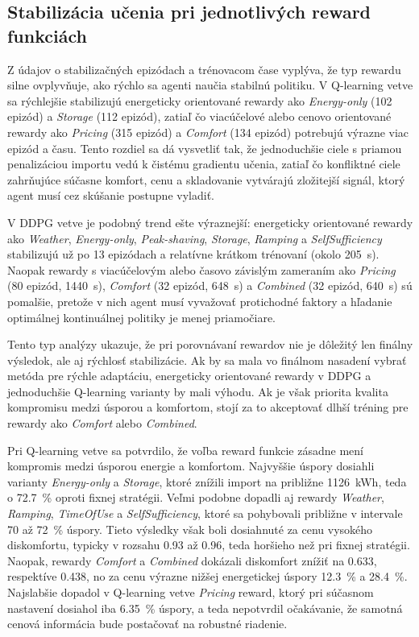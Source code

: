 \documentclass[conference]{IEEEtran}
\begin{document}
\subsection{Stabilizácia učenia pri jednotlivých reward funkciách}

Z údajov o stabilizačných epizódach a trénovacom čase vyplýva, že typ rewardu silne ovplyvňuje, ako rýchlo sa agenti naučia stabilnú politiku. V Q-learning vetve sa rýchlejšie stabilizujú energeticky orientované rewardy ako \textit{Energy-only} (102 epizód) a \textit{Storage} (112 epizód), zatiaľ čo viacúčelové alebo cenovo orientované rewardy ako \textit{Pricing} (315 epizód) a \textit{Comfort} (134 epizód) potrebujú výrazne viac epizód a času. Tento rozdiel sa dá vysvetliť tak, že jednoduchšie ciele s priamou penalizáciou importu vedú k čistému gradientu učenia, zatiaľ čo konfliktné ciele zahrňujúce súčasne komfort, cenu a skladovanie vytvárajú zložitejší signál, ktorý agent musí cez skúšanie postupne vyladiť.

V DDPG vetve je podobný trend ešte výraznejší: energeticky orientované rewardy ako \textit{Weather}, \textit{Energy-only}, \textit{Peak-shaving}, \textit{Storage}, \textit{Ramping} a \textit{SelfSufficiency} stabilizujú už po 13 epizódach a relatívne krátkom trénovaní (okolo 205~s). Naopak rewardy s viacúčelovým alebo časovo závislým zameraním ako \textit{Pricing} (80 epizód, 1440~s), \textit{Comfort} (32 epizód, 648~s) a \textit{Combined} (32 epizód, 640~s) sú pomalšie, pretože v nich agent musí vyvažovať protichodné faktory a hľadanie optimálnej kontinuálnej politiky je menej priamočiare.

Tento typ analýzy ukazuje, že pri porovnávaní rewardov nie je dôležitý len finálny výsledok, ale aj rýchlosť stabilizácie. Ak by sa mala vo finálnom nasadení vybrať metóda pre rýchle adaptáciu, energeticky orientované rewardy v DDPG a jednoduchšie Q-learning varianty by mali výhodu. Ak je však priorita kvalita kompromisu medzi úsporou a komfortom, stojí za to akceptovať dlhší tréning pre rewardy ako \textit{Comfort} alebo \textit{Combined}.

Pri Q-learning vetve sa potvrdilo, že voľba reward funkcie zásadne mení kompromis medzi úsporou energie a komfortom. Najvyššie úspory dosiahli varianty \textit{Energy-only} a \textit{Storage}, ktoré znížili import na približne 1126~kWh, teda o 72.7~\% oproti fixnej stratégii. Veľmi podobne dopadli aj rewardy \textit{Weather}, \textit{Ramping}, \textit{TimeOfUse} a \textit{SelfSufficiency}, ktoré sa pohybovali približne v intervale 70 až 72~\% úspory. Tieto výsledky však boli dosiahnuté za cenu vysokého diskomfortu, typicky v rozsahu 0.93 až 0.96, teda horšieho než pri fixnej stratégii. Naopak, rewardy \textit{Comfort} a \textit{Combined} dokázali diskomfort znížiť na 0.633, respektíve 0.438, no za cenu výrazne nižšej energetickej úspory 12.3~\% a 28.4~\%. Najslabšie dopadol v Q-learning vetve \textit{Pricing} reward, ktorý pri súčasnom nastavení dosiahol iba 6.35~\% úspory, a teda nepotvrdil očakávanie, že samotná cenová informácia bude postačovať na robustné riadenie.
\end{document}
